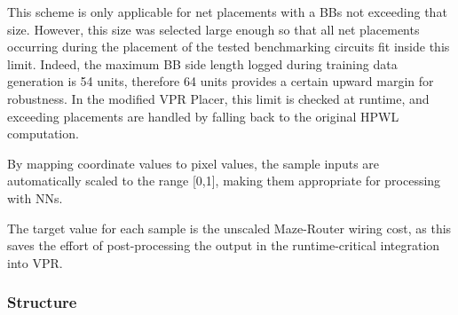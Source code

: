 This scheme is only applicable for net placements with a \glspl{BB} not exceeding that size. However, this size was selected large enough so that all net placements occurring during the placement of the tested benchmarking circuits fit inside this limit. Indeed, the maximum \gls{BB} side length logged during training data generation is 54 units, therefore 64 units provides a certain upward margin for robustness. In the modified \gls{VPR} Placer, this limit is checked at runtime, and exceeding placements are handled by falling back to the original \gls{HPWL} computation.

By mapping coordinate values to pixel values, the sample inputs are automatically scaled to the range [0,1], making them appropriate for processing with \glspl{NN}.

The target value for each sample is the unscaled Maze-Router wiring cost, as this saves the effort of post-processing the output in the runtime-critical integration into \gls{VPR}.

\subsubsection{Structure}\label{ch:cnn-design}

